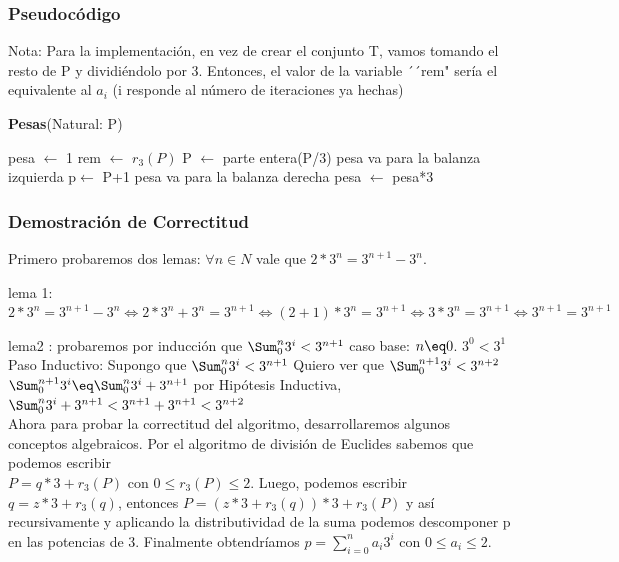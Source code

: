 \documentclass[spanish,12pt]{article}
\begin{document}
\subsubsection{Pseudocódigo}

Nota: Para la implementación, en vez de crear el conjunto T, vamos tomando el resto de P y dividiéndolo por 3. Entonces, el valor de la variable ´´rem" sería el equivalente al $a_i$ (i responde al número de iteraciones ya hechas)

\begin{algorithm}[H]{\textbf{Pesas}(Natural: P)}
	\begin{algorithmic}[1]
		\State pesa $\gets$ 1
		 	\State rem $\gets$ $r_3 (P)$
	    		\State P $\gets $ parte entera(P/3)
	    			\State pesa va para la balanza izquierda    			\Else
	    				\State p$\gets$ P+1
	    				\State pesa va para la balanza derecha
				\EndIf
			\EndIf
			\State pesa $\gets$ pesa*3
		\EndWhile
	\end{algorithmic}
\end{algorithm}



\subsubsection{Demostración de Correctitud}

Primero probaremos dos lemas:
$\forall n \in N$ vale que  $2*3^{n} = 3^{n+1}-3^{n}$.

lema 1:$ 2*3^{n} = 3^{n+1}-3^{n} \Longleftrightarrow 2*3^{n}+3^{n} = 3^{n+1} \Longleftrightarrow (2+1)*3^{n} = 3^{n+1} \Longleftrightarrow   3*3^{n} = 3^{n+1} \Longleftrightarrow  3^{n+1} = 3^{n+1}$ 

lema2 : probaremos por inducción que $ \Sum_{0}^{n}{3^{i}} < 3^{n+1}$
caso base: $n \eq 0$. $3^{0} < 3^{1}$
Paso Inductivo: 
	Supongo que $ \Sum_{0}^{n}{3^{i}} < 3^{n+1}$
	Quiero ver que $ \Sum_{0}^{n+1}{3^{i}} < 3^{n+2}$
	$ \Sum_{0}^{n+1}{3^{i}} \eq \Sum_{0}^{n}{3^{i}} + 3^{n+1}$
	por Hipótesis Inductiva, $\Sum_{0}^{n}{3^{i}} + 3^{n+1} < 3^{n+1} + 3^{n+1} < 3^{n+2} $
\\
Ahora para probar la correctitud del algoritmo, desarrollaremos algunos conceptos algebraicos.
Por el algoritmo de división de Euclides sabemos que podemos escribir \\  $P= q*3+ r_{3}(P)$ con $0\leq r_{3}(P) \leq 2 $. Luego, podemos escribir $q= z*3 + r_{3}(q)$, entonces $P= (z*3 + r_{3}(q))*3 +r_{3}(P)$ y así recursivamente y aplicando la distributividad de la suma podemos descomponer p en las potencias de 3. Finalmente obtendríamos $p= \sum_{i=0}^{n}{a_i 3^{i}} $ con $0 \leq a_i \leq 2$.
\end{document}
